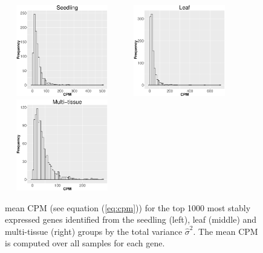 \documentclass[11pt, a4paper]{article}
\begin{document}
\begin{figure}[] \begin{center}
    \includegraphics[width=5cm,height=4cm]{Figures/cpm_seedling.eps}
    \includegraphics[width=5cm,height=4cm]{Figures/cpm_leaves.eps}
    \includegraphics[width=5cm,height=4cm]{Figures/cpm_tissue.eps}
    \caption{{\small{\label{cpm} mean CPM (see equation (\ref{eq:cpm})) for the top 1000 most stably expressed genes identified from the seedling (left), leaf (middle) and multi-tissue
    (right) groups by the total variance $\hat{\sigma}^2$}}. The mean CPM is computed over all samples for each gene.} \end{center} 
\end{figure} 

\end{document}
